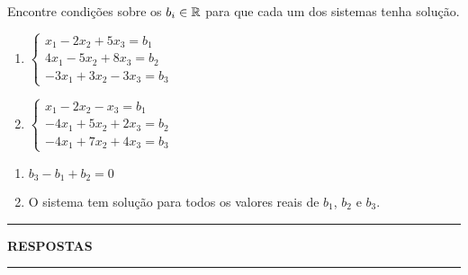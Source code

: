 \documentclass[12pt]{exam}
\begin{document}
\begin{exercicio}
  Encontre condições sobre os $b_i \in \mathbb{R}$ para que cada um dos sistemas tenha solução.
  \begin{enumerate}[label={\alph*})]
    \item $\begin{cases}
      x_1 - 2x_2 + 5x_3 = b_1\\
      4x_1 - 5x_2 + 8x_3 = b_2\\
      -3x_1 + 3x_2 - 3x_3 = b_3
    \end{cases}$

    \item $\begin{cases}
      x_1 - 2x_2 - x_3 = b_1\\
      -4x_1 + 5x_2 + 2x_3 = b_2\\
      -4x_1 + 7x_2 + 4x_3 = b_3
    \end{cases}$
  \end{enumerate}
  \begin{solucao}
    \begin{enumerate}[label={\alph*})]
      \item $b_3 - b_1 + b_2 = 0$
      \item O sistema tem solução para todos os valores reais de $b_1$, $b_2$ e $b_3$.
    \end{enumerate}
  \end{solucao}
\end{exercicio}

\newpage
{}
\hrule
\begin{center}
{\large\bf RESPOSTAS}
\end{center}
\hrule

\end{document}
